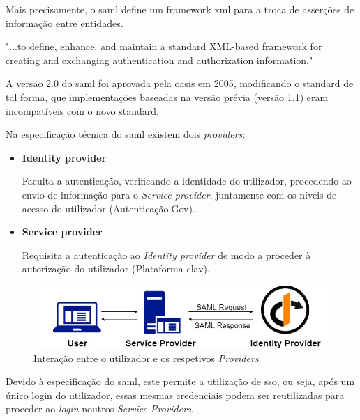 Mais precisamente, o \gls{saml} define um framework \gls{xml} para a troca de asserções de informação entre entidades. 

\begin{displayquote}
"...to define, enhance, and maintain a standard XML-based framework for creating and 
exchanging authentication and authorization information."
\\[5pt]
\end{displayquote}

A versão 2.0 do \gls{saml} foi aprovada pela \gls{oasis} em 2005, modificando o standard de tal forma, que implementações baseadas na versão prévia (versão 1.1) eram incompatíveis com o novo standard.

Na especificação técnica do \gls{saml} existem dois \emph{providers}:

\begin{itemize}
    \item \textbf{Identity provider}
    
    Faculta a autenticação, verificando a identidade do utilizador, procedendo ao envio de informação para o \emph{Service provider}, juntamente com os níveis de acesso do utilizador (Autenticação.Gov).
    
    \item \textbf{Service provider}
    
    Requisita a autenticação ao \emph{Identity provider} de modo a proceder à autorização do utilizador (Plataforma \gls{clav}).
\end{itemize}

\begin{figure}[h]
    \centering
    \includegraphics[width=\textwidth]{img/saml/samlproviders.jpg}
    \caption{Interação entre o utilizador e os respetivos \emph{Providers}. \cite{samlProviderPic}}
\end{figure}

Devido à especificação do \gls{saml}, este permite a utilização de \gls{sso}, ou seja, após um único login do utilizador, essas mesmas credenciais podem ser reutilizadas para proceder ao \emph{login} noutros \emph{Service Providers}.

